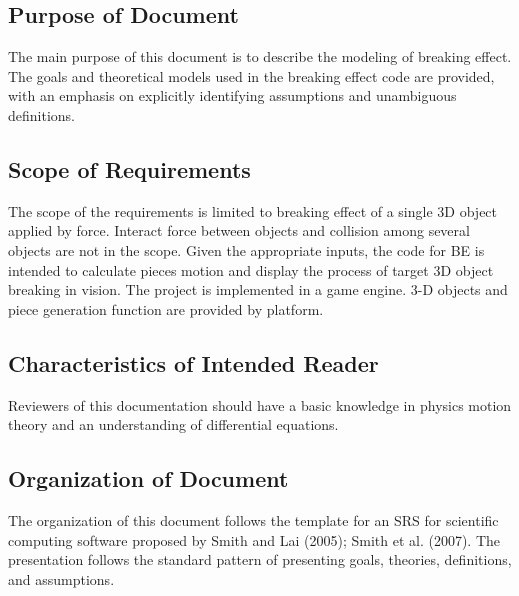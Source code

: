 \documentclass[12pt]{article}
\begin{document}
	
	\subsection{Purpose of Document}
	
	The main purpose of this document is to describe the modeling of breaking effect. The goals and theoretical models used in the breaking effect code are provided, with an emphasis on explicitly identifying assumptions and unambiguous definitions. 
	
	\subsection{Scope of Requirements} 
	
	The scope of the requirements is limited to breaking effect of a single 3D object applied by force. Interact force between objects and collision among several objects are not in the scope. Given the appropriate inputs, the code for BE is intended to calculate pieces motion and display the process of target 3D object breaking in vision. The project is implemented in a game engine. 3-D objects and piece generation function are provided by platform. 
	
	\subsection{Characteristics of Intended Reader} 
	
	Reviewers of this documentation should have a basic knowledge in physics motion
	theory and an understanding of differential equations.  
	
	\subsection{Organization of Document}
	
	The organization of this document follows the template for an SRS for scientific
	computing software proposed by Smith and Lai (2005); Smith et al. (2007). The
	presentation follows the standard pattern of presenting goals, theories,
	definitions, and assumptions. 
	
\end{document}
